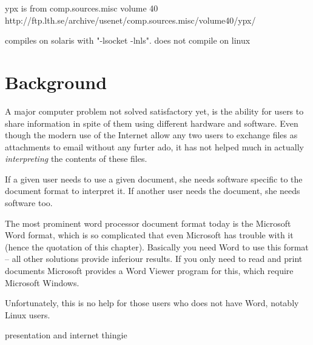 















ypx is from comp.sources.misc volume 40
http://ftp.lth.se/archive/usenet/comp.sources.misc/volume40/ypx/

compiles on solaris with "-lsocket -lnls".  does not compile
on linux



\section{Background}

A major computer problem not solved satisfactory yet, is the
ability for users to share information in spite of them
using different hardware and software.  Even though the
modern use of the Internet allow any two users to exchange
files as attachments to email without any furter ado, it has
not helped much in actually \textit{interpreting} the
contents of these files.

If a given user needs to use a given document, she needs
software specific to the document format to interpret it.
If another user needs the document, she needs software too.

The most prominent word processor document format today is
the Microsoft Word format, which is so complicated that even
Microsoft has trouble with it (hence the quotation of this
chapter).  Basically you need Word to use this format -- all
other solutions provide inferiour results.  If you only need
to read and print documents Microsoft provides a Word Viewer
program for this, which require Microsoft Windows.

Unfortunately, this is no help for those users who does not
have Word, notably Linux users.

\textsf{presentation and internet thingie}




